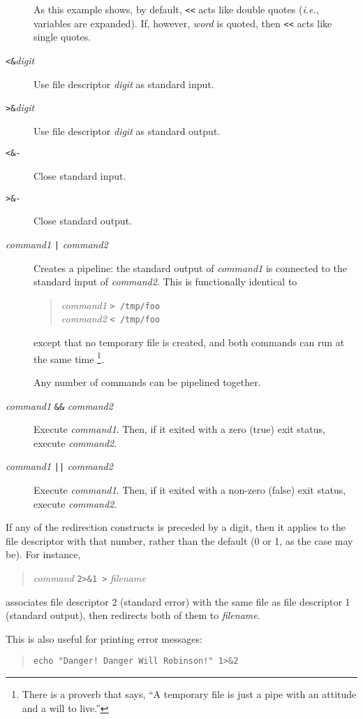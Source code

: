 \documentclass{article}
\newcommand{\code}[1]{\texttt{#1}}
\begin{document}
\begin{description}
	As this example shows, by default, \code{<<} acts like double
	quotes (\textit{i.e.}, variables are expanded). If, however,
	\textit{word} is quoted, then \code{<<} acts like single
	quotes.
\item[\code{<\&}\textit{digit}]
	Use file descriptor \textit{digit} as standard input.
\item[\code{>\&}\textit{digit}]
	Use file descriptor \textit{digit} as standard output.
\item[\code{<\&-}]
	Close standard input.
\item[\code{>\&-}]
	Close standard output.
\item[\textit{command1} \code{|} \textit{command2}]
	Creates a pipeline: the standard output of \textit{command1}
	is connected to the standard input of \textit{command2}. This
	is functionally identical to
	\begin{quote}
	\textit{command1} \code{> /tmp/foo}\\
	\textit{command2} \code{< /tmp/foo}
	\end{quote}
	except that no temporary file is created, and both commands
	can run at the same time%
	\footnote{There is a proverb that says, ``A temporary file is
	just a pipe with an attitude and a will to live.''}.

	Any number of commands can be pipelined together.
\item[\textit{command1} \code{\&\&} \textit{command2}]
	Execute \textit{command1}. Then, if it exited with a zero
	(true) exit status, execute \textit{command2}.
\item[\textit{command1} \code{||} \textit{command2}]
	Execute \textit{command1}. Then, if it exited with a non-zero
	(false) exit status, execute \textit{command2}.
\end{description}

	If any of the redirection constructs is preceded by a digit,
then it applies to the file descriptor with that number, rather than
the default (0 or 1, as the case may be). For instance,
\begin{quote}
\textit{command} \code{2>\&1 >} \textit{filename}
\end{quote}
associates file descriptor 2 (standard error) with the same file as
file descriptor 1 (standard output), then redirects both of them to
\textit{filename}.

	This is also useful for printing error messages:
\begin{quote}
\code{echo "Danger! Danger Will Robinson!" 1>\&2}
\end{quote}
\end{document}
